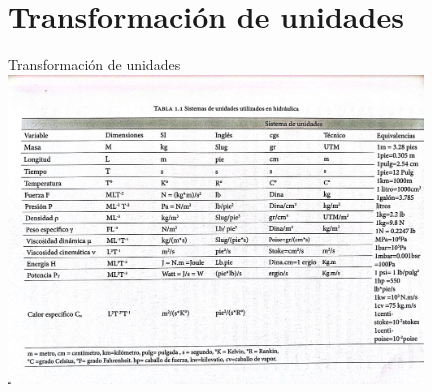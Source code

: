 \documentclass [xcolor=svgnames, t] {beamer}
\begin{document}
\section{Transformaci\'on de unidades}
\begin{frame}{Transformaci\'on de unidades}
\centering
\includegraphics[width=11cm]{unitsDuarte}
\end{frame}
\end{document}
